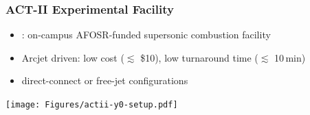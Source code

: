 \documentclass{beamer}
\begin{document}
  
  \begin{frame}\frametitle{ACT-II Experimental Facility}
  
  \vspace*{0.15in}
  \begin{itemize}
  \setlength{\itemsep}{0.15in}
  \item {}:  on-campus AFOSR-funded supersonic combustion facility
  \item Arcjet driven: low cost ($\lesssim$ \$10), low turnaround
    time ($\lesssim$ 10\,min)
   \item direct-connect or free-jet configurations
  \end{itemize}
  \begin{center}
  \texttt{[image: Figures/actii-y0-setup.pdf]}
  \end{center}
  
  \end{frame}
  
 
\end{document}

